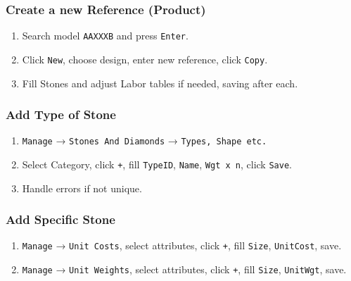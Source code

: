 \subsubsection*{Create a new \textbf{Reference} (Product)}
\begin{enumerate}[leftmargin=*]
  \item Search model \texttt{AAXXXB} and press \texttt{Enter}.
  \item Click \texttt{New}, choose design, enter new reference, click \texttt{Copy}.
  \item Fill Stones and adjust Labor tables if needed, saving after each.
\end{enumerate}

\subsubsection*{Add Type of Stone}
\begin{enumerate}[leftmargin=*]
  \item \texttt{Manage} → \texttt{Stones And Diamonds} → \texttt{Types, Shape etc.}
  \item Select Category, click \texttt{+}, fill \texttt{TypeID}, \texttt{Name}, \texttt{Wgt x n}, click \texttt{Save}.
  \item Handle errors if not unique.
\end{enumerate}

\subsubsection*{Add Specific Stone}
\begin{enumerate}[leftmargin=*]
  \item \texttt{Manage} → \texttt{Unit Costs}, select attributes, click \texttt{+}, fill \texttt{Size}, \texttt{UnitCost}, save.
  \item \texttt{Manage} → \texttt{Unit Weights}, select attributes, click \texttt{+}, fill \texttt{Size}, \texttt{UnitWgt}, save.
\end{enumerate}
